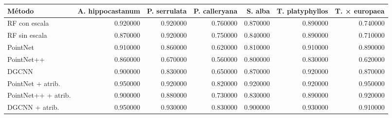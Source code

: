 \begin{tabular}{lrrrrrr}
\toprule
Método & A. hippocastanum & P. serrulata & P. calleryana & S. alba & T. platyphyllos & T. × europaea \\
\midrule
RF con escala & 0.920000 & 0.920000 & 0.760000 & 0.870000 & 0.890000 & 0.740000 \\
RF sin escala & 0.870000 & 0.920000 & 0.750000 & 0.840000 & 0.890000 & 0.710000 \\
PointNet & 0.910000 & 0.860000 & 0.620000 & 0.810000 & 0.910000 & 0.890000 \\
PointNet++ & 0.860000 & 0.670000 & 0.560000 & 0.800000 & 0.830000 & 0.620000 \\
DGCNN & 0.900000 & 0.830000 & 0.650000 & 0.870000 & 0.920000 & 0.870000 \\
PointNet + atrib. & 0.950000 & 0.920000 & 0.820000 & 0.920000 & 0.920000 & 0.950000 \\
PointNet++ + atrib. & 0.900000 & 0.880000 & 0.730000 & 0.830000 & 0.890000 & 0.920000 \\
DGCNN + atrib. & 0.950000 & 0.930000 & 0.830000 & 0.900000 & 0.930000 & 0.910000 \\
\bottomrule
\end{tabular}
